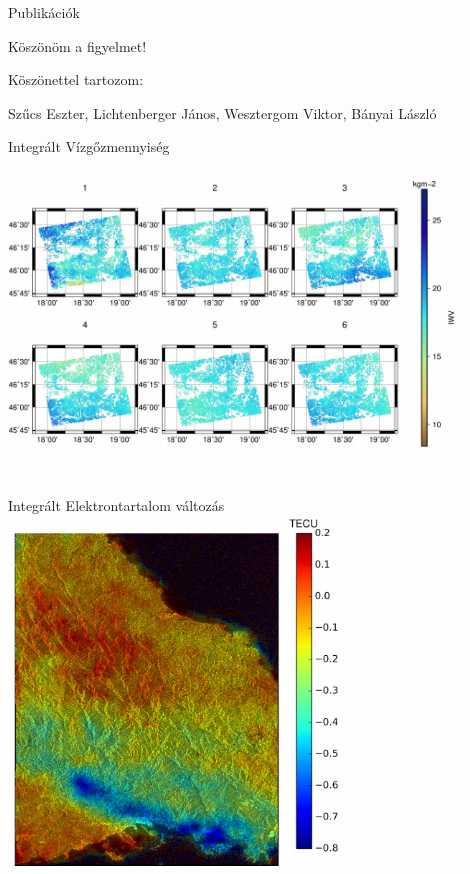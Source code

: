 \documentclass{beamer}
\begin{document}
\begin{frame}{Publikációk}
    
    
\end{frame}

\begin{frame}
    \begin{center}
        \Huge \fcol
        Köszönöm a figyelmet!
    \end{center}
    \vspace{25pt}
    
    \begin{center}
        \Large \center Köszönettel tartozom:
        
        Szűcs Eszter, Lichtenberger János, Wesztergom Viktor, Bányai László
    \end{center}
    \vspace{10pt}

\end{frame}



\begin{frame}{Integrált Vízgőzmennyiség}
\includegraphics[width=0.9\textwidth]{iwv.png}
\end{frame}


\begin{frame}{Integrált Elektrontartalom változás}
\includegraphics[width=0.7\textwidth]{iono.png}
\end{frame}

\begin{frame}{}
\cite{Szucs2018, banyai2018mHuholdradar}
\end{frame}
\end{document}
